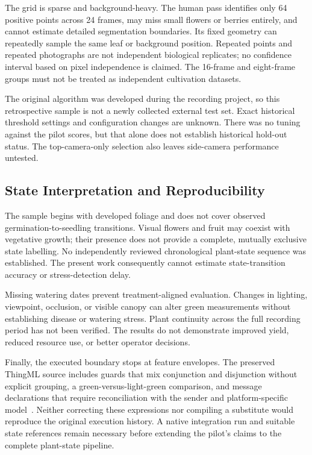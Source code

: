 \documentclass[runningheads]{llncs}
\begin{document}
The grid is sparse and background-heavy. The human pass identifies only 64 positive points across 24 frames, may miss small flowers or berries entirely, and cannot estimate detailed segmentation boundaries. Its fixed geometry can repeatedly sample the same leaf or background position. Repeated points and repeated photographs are not independent biological replicates; no confidence interval based on pixel independence is claimed. The 16-frame and eight-frame groups must not be treated as independent cultivation datasets.

The original algorithm was developed during the recording project, so this retrospective sample is not a newly collected external test set. Exact historical threshold settings and configuration changes are unknown. There was no tuning against the pilot scores, but that alone does not establish historical hold-out status. The top-camera-only selection also leaves side-camera performance untested.

\subsection{State Interpretation and Reproducibility}
The sample begins with developed foliage and does not cover observed germination-to-seedling transitions. Visual flowers and fruit may coexist with vegetative growth; their presence does not provide a complete, mutually exclusive state labelling. No independently reviewed chronological plant-state sequence was established. The present work consequently cannot estimate state-transition accuracy or stress-detection delay.

Missing watering dates prevent treatment-aligned evaluation. Changes in lighting, viewpoint, occlusion, or visible canopy can alter green measurements without establishing disease or watering stress. Plant continuity across the full recording period has not been verified. The results do not demonstrate improved yield, reduced resource use, or better operator decisions.

Finally, the executed boundary stops at feature envelopes. The preserved ThingML source includes guards that mix conjunction and disjunction without explicit grouping, a green-versus-light-green comparison, and message declarations that require reconciliation with the sender and platform-specific model~\cite{autotent}. Neither correcting these expressions nor compiling a substitute would reproduce the original execution history. A native integration run and suitable state references remain necessary before extending the pilot's claims to the complete plant-state pipeline.
\end{document}
